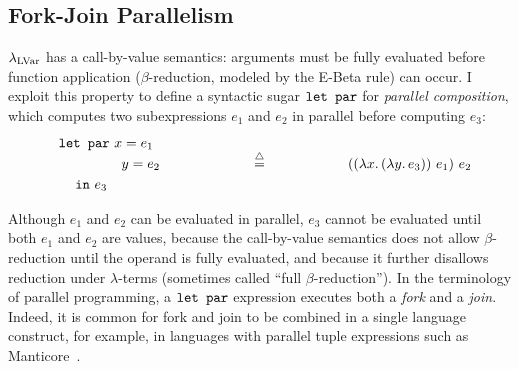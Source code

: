 \subsection{Fork-Join Parallelism}\label{subsection:fork-join}

$\lambda_{\textrm{LVar}}$ has a call-by-value semantics: arguments must be fully
evaluated before function application ($\beta$-reduction, modeled by
the {\sc E-Beta} rule) can occur.  I exploit this property to define a
syntactic sugar $\mbox{\texttt{\mbox{\texttt{let}}~\mbox{\texttt{par}}}}$ for \emph{parallel composition}, which
computes two subexpressions $e_1$ and $e_2$ in parallel before
computing $e_3$:
\begin{displaymath}
\begin{minipage}[b]{2in}
  \begin{equation*}
\begin{split}
& \LETPAR ~x = e_1 \\ 
& \letparspace ~y = e_2 \\
& \letspace \IN~e_3 
\end{split}
\end{equation*}
\end{minipage}
\begin{minipage}[b]{1in}
\centering
$\defeq$
\end{minipage}
\begin{minipage}[b]{2in}
\begin{equation*}
  \app{(\app{(\lam{x}{(\lam{y}{e_3})})}{e_1})}{e_2}
\end{equation*}
\end{minipage}
\end{displaymath}

Although $e_1$ and $e_2$ can be evaluated in parallel, $e_3$ cannot be
evaluated until both $e_1$ and $e_2$ are values, because the
call-by-value semantics does not allow $\beta$-reduction until the
operand is fully evaluated, and because it further disallows reduction
under $\lambda$-terms (sometimes called ``full $\beta$-reduction'').
In the terminology of parallel programming, a $\mbox{\texttt{\mbox{\texttt{let}}~\mbox{\texttt{par}}}}$ expression
executes both a \emph{fork} and a \emph{join}.  Indeed, it is common
for fork and join to be combined in a single language construct, for
example, in languages with parallel tuple expressions such as
Manticore~\cite{manticore_parallel_tuples}.

